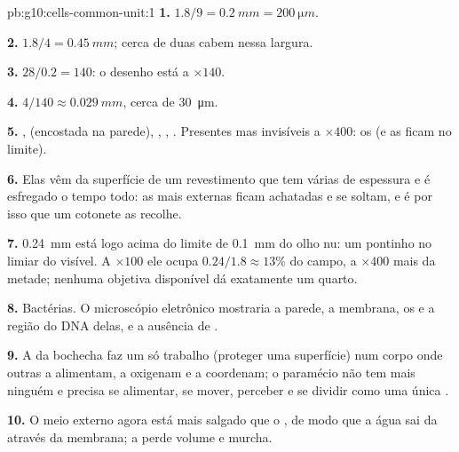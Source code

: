 \begin{solution}{pb:g10:cells-common-unit:1}
\textbf{1.} $1.8/9 = \qty{0.2}{mm} = \qty{200}{\micro m}$.

\textbf{2.} $1.8/4 = \qty{0.45}{mm}$; cerca de duas  cabem nessa largura.

\textbf{3.} $28/0.2 = 140$: o desenho está a $\times 140$.

\textbf{4.} $4/140 \approx \qty{0.029}{mm}$, cerca de \qty{30}{\micro m}.

\textbf{5.} ,  (encostada na parede),
, , . Presentes mas invisíveis a $\times 400$:
os  (e as  ficam no limite).

\textbf{6.} Elas vêm da superfície de um revestimento que tem várias
 de espessura e é esfregado o tempo todo: as  mais
externas ficam achatadas e se soltam, e é por isso que um cotonete as
recolhe.

\textbf{7.} \qty{0.24}{mm} está logo acima do limite de \qty{0.1}{mm} do
olho nu: um pontinho no limiar do visível. A $\times 100$ ele ocupa
$0.24/1.8 \approx 13\%$ do campo, a $\times 400$ mais da metade;
nenhuma objetiva disponível dá exatamente um quarto.

\textbf{8.} Bactérias. O microscópio eletrônico mostraria a parede, a
membrana, os  e a região do DNA delas, e a ausência de .

\textbf{9.} A  da bochecha faz um só trabalho (proteger uma
superfície) num corpo onde outras  a alimentam, a oxigenam e a
coordenam; o paramécio não tem mais ninguém e precisa se alimentar, se
mover, perceber e se dividir como uma única .

\textbf{10.} O meio externo agora está mais salgado que o , de
modo que a água sai da  através da membrana; a  perde
volume e murcha.


\end{solution}
